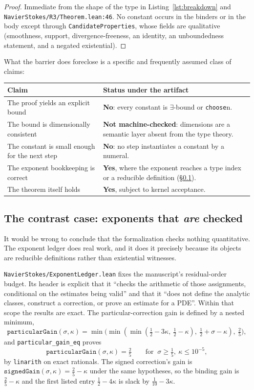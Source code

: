\documentclass[11pt]{article}
\newcommand{\ct}[1]{\texttt{#1}}
\newcommand{\file}[1]{\texttt{\small #1}}
\theoremstyle{plain}
\theoremstyle{definition}
\theoremstyle{remark}
\begin{document}
\begin{proof}
Immediate from the shape of the type in Listing~\ref{lst:breakdown} and
\file{NavierStokes/R3/Theorem.lean:46}. No constant occurs in the binders or in
the body except through \ct{CandidateProperties}, whose fields are qualitative
(smoothness, support, divergence-freeness, an identity, an unboundedness
statement, and a negated existential).
\end{proof}

What the barrier does foreclose is a specific and frequently assumed class of
claims:

\begin{center}
\begin{tabular}{@{}p{}p{}@{}}
\toprule
Claim & Status under the artifact \\
\midrule
The proof yields an explicit bound & \textbf{No}: every constant is
$\exists$-bound or \ct{choose}n. \\
The bound is dimensionally consistent & \textbf{Not machine-checked}:
dimensions are a semantic layer absent from the type theory. \\
The constant is small enough for the next step & \textbf{No}: no step
instantiates a constant by a numeral. \\
The exponent bookkeeping is correct & \textbf{Yes}, where the exponent reaches
a type index or a reducible definition (\S\ref{sec:ledger}). \\
The theorem itself holds & \textbf{Yes}, subject to kernel acceptance. \\
\bottomrule
\end{tabular}
\end{center}

\subsection{The contrast case: exponents that \emph{are} checked}
\label{sec:ledger}

It would be wrong to conclude that the formalization checks nothing
quantitative. The exponent ledger does real work, and it does it precisely
because its objects are reducible definitions rather than existential witnesses.

\file{NavierStokes/ExponentLedger.lean} fixes the manuscript's residual-order
budget. Its header is explicit that it ``checks the arithmetic of those
assignments, conditional on the estimates being valid'' and that it ``does not
define the analytic classes, construct a correction, or prove an estimate for a
PDE''. Within that scope the results are exact. The particular-correction gain is
defined by a nested minimum,
\[
  \ct{particularGain}(\sigma,\kappa)
  =\min\bigl(\min(\min(\tfrac12-3\kappa,\ \tfrac12-\kappa),\ \tfrac12+\sigma-\kappa),\ \tfrac25\bigr),
\]
and \ct{particular\_gain\_eq} proves
\[
  \ct{particularGain}(\sigma,\kappa)=\tfrac25
  \qquad\text{for }\ \sigma\ge\tfrac15,\ \kappa\le10^{-5},
\]
by \ct{linarith} on exact rationals. The signed correction's gain is
$\ct{signedGain}(\sigma,\kappa)=\tfrac25-\kappa$ under the same hypotheses, so
the binding gain is $\tfrac25-\kappa$ and the first listed entry
$\tfrac12-4\kappa$ is slack by $\tfrac1{10}-3\kappa$.
\end{document}
